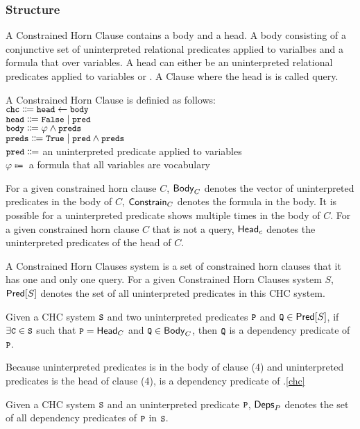\subsubsection{Structure}
A Constrained Horn Clause contains a body and a head.
%
A body consisting of a conjunctive set of uninterpreted relational predicates applied to varialbes and a formula
that over variables.
%
A head can either be an uninterpreted relational predicates applied to variables or .
%
A Clause where the head is  is called query.
\begin{defn}
  A Constrained Horn Clause is definied as follows: \\
  $\cc{chc} \Coloneqq \cc{head} \gets \cc{body}$ \\
  $\cc{head} \Coloneqq \cc{False} \mid \cc{pred}$  \\
  $\cc{body} \Coloneqq \varphi \wedge \cc{preds}$ \\
  $\cc{preds} \Coloneqq \cc{True} \mid \cc{pred} \wedge \cc{preds}$ \\
  $\cc{pred} \Coloneqq$ an uninterpreted predicate applied to variables \\
  $\varphi \Coloneqq$ a formula that all variables are vocabulary \\
\end{defn}
%
For a given constrained horn clause $C$, $\mathsf{Body}_{C}$ denotes
the vector of uninterpreted predicates in the body of $C$, $\mathsf{Constrain}_{C}$
denotes the formula in the body.
%
It is possible for a uninterpreted predicate shows multiple times in the
body of $C$.
%
For a given constrained horn clause $C$ that is not a query,
$\mathsf{Head}_{c}$ denotes the uninterpreted predicates of the head of $C$.
%

A Constrained Horn Clauses system is a set of constrained horn clauses 
that it has one and only one query.
%
For a given Constrained Horn Clauses system $S$,$\mathsf{Pred}[ S ]$ denotes 
the set of all uninterpreted predicates in this CHC system.

\begin{defn}
  Given a CHC system $\cc{S}$ and two uninterpreted predicates $\cc{P}$ and
  $\cc{Q} \in \predof{S}$, if $\exists \cc{C} \in \cc{S}$ such that $\cc{P} = \headof{C}$
  and $\cc{Q} \in \bodyof{C}$, then $\cc{Q}$ is a dependency predicate of $\cc{P}$.
\end{defn}
%
\begin{ex}
  Because uninterpreted predicates  is in the body of clause (4) and uninterpreted predicates 
  is the head of clause (4),  is a dependency predicate of .\autoref{chc}
\end{ex}
%
Given a CHC system $\cc{S}$ and an uninterpreted predicate $\cc{P}$, $\mathsf{Deps}_{P}$
denotes the set of all dependency predicates of $\cc{P}$ in $\cc{S}$.
%

